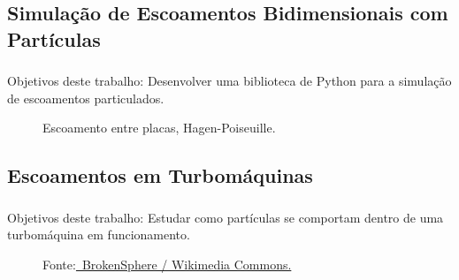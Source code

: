 \documentclass{beamer}
\begin{document}
\subsection{Simulação de Escoamentos Bidimensionais com Partículas} %
\begin{frame}
  \frametitle{\subsecname}
  
  \begin{block}{Objetivos deste trabalho:}
    Desenvolver uma biblioteca de Python para a simulação de escoamentos particulados.
  \end{block}
  
  \begin{figure}
     {\raggedleft \tiny Escoamento entre placas, Hagen-Poiseuille.}
  \end{figure}
\end{frame}

\subsection{Escoamentos em Turbomáquinas}
\begin{frame}
  \frametitle{\subsecname}
  
  \begin{block}{Objetivos deste trabalho:}
    Estudar como partículas se comportam dentro de uma turbomáquina em funcionamento.
  \end{block}
  
  \begin{figure}
     {\raggedleft \tiny Fonte:\href{https://commons.wikimedia.org/wiki/File:Washing_machine_agitator.JPG}
      {\textcopyright \ BrokenSphere / Wikimedia Commons.}}
  \end{figure}
\end{frame}
\end{document}
